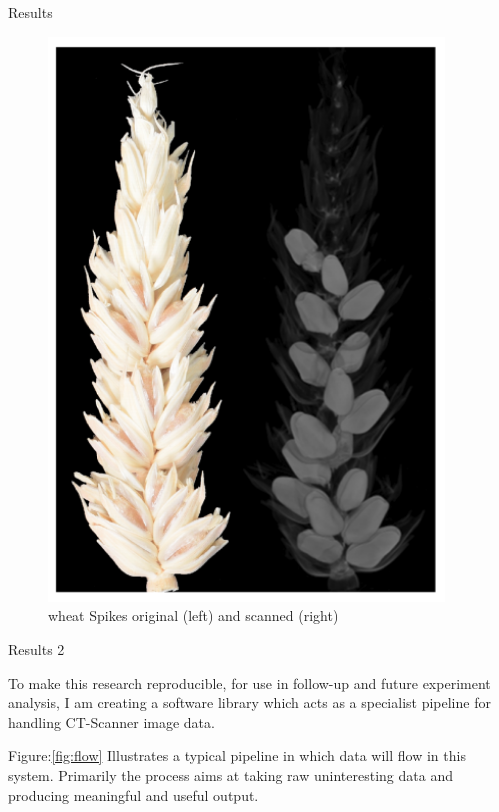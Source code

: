 \documentclass[final]{beamer}
\begin{document}
\begin{frame}{}
\begin{textblock}{28}
\begin{block}{Results}
\begin{multicols}{2}
        \begin{figure}[htb]
          \centering
          \includegraphics[width=10.5cm]{collection.png}
          \caption{\label{fig:3d} wheat Spikes original (left) and scanned (right)}
        \end{figure}

      \end{multicols}

    \end{block}

    \begin{block}{Results 2}
      \begin{multicols}{2}

      To make this research reproducible, for use in follow-up and future experiment analysis,
      I am creating a software library which acts as a specialist pipeline for handling CT-Scanner
      image data.

      \vspace{0.5cm}

      Figure:\ref{fig:flow} Illustrates a typical pipeline in which data will flow in this system.
      Primarily the process aims at taking raw uninteresting data and producing meaningful and useful
      output.


\end{multicols}
\end{block}
\end{textblock}
\end{frame}
\end{document}
